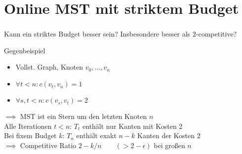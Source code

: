 \section{Online MST mit striktem Budget}

\begin{frame}
    \frametitle{\insertsection}
    Kann ein striktes Budget besser sein? Insbesondere besser als $2$-competitive?
    \begin{block}{Gegenbeispiel}
        \begin{itemize}
        \item Vollst. Graph, Knoten $v_0,...,v_n$
        \item $\forall t < n: c(v_t, v_n) = 1$
        \item $\forall s, t < n: c(v_s, v_t) = 2$
        \end{itemize}
        $\implies$ MST ist ein Stern um den letzten Knoten $n$\\
        \vspace{1em}
        Alle Iterationen $t < n$: $T_t$ enthält nur Kanten mit Kosten 2\\
        \vspace{1em}
        Bei fixem Budget $k$: $T_n$ enthält exakt $n-k$ Kanten der Kosten 2\\
        \vspace{1em}
        $\implies$ Competitive Ratio $2 - k/n \qquad (> 2 - \epsilon)$ bei großen $n$
    \end{block}
\end{frame}